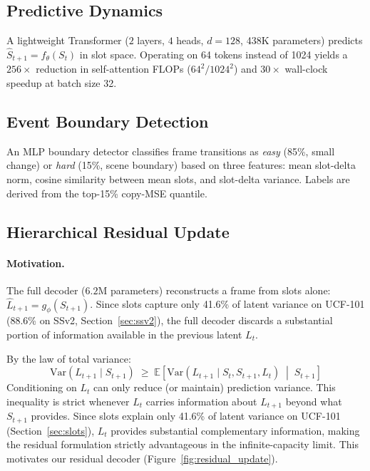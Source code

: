 \documentclass{article}
\begin{document}
\subsection{Predictive Dynamics}
\label{sec:dynamics}

A lightweight Transformer ($2$ layers, $4$ heads, $d{=}128$, 438K
parameters) predicts $\hat{S}_{t+1} = f_\theta(S_t)$ in slot space.
Operating on 64 tokens instead of 1024 yields a $256\times$ reduction
in self-attention FLOPs ($64^2/1024^2$) and $30\times$ wall-clock
speedup at batch size 32.

\subsection{Event Boundary Detection}
\label{sec:boundary}

An MLP boundary detector classifies frame transitions as \emph{easy}
(85\%, small change) or \emph{hard} (15\%, scene boundary) based on
three features: mean slot-delta norm, cosine similarity between mean
slots, and slot-delta variance.
Labels are derived from the top-15\% copy-MSE quantile.

\subsection{Hierarchical Residual Update}
\label{sec:residual}

\paragraph{Motivation.}
The full decoder ($6.2$M parameters) reconstructs a frame from slots
alone: $\hat{L}_{t+1} = g_\phi(S_{t+1})$.
Since slots capture only 41.6\% of latent variance on UCF-101 (88.6\%
on SSv2, Section~\ref{sec:ssv2}), the full decoder discards a
substantial portion of information available in the previous latent
$L_t$.

By the law of total variance:
\begin{equation}
\text{Var}(L_{t+1} \mid S_{t+1})
  \;\geq\; \mathbb{E}\!\left[
    \text{Var}(L_{t+1} \mid S_t, S_{t+1}, L_t)
    \;\middle|\; S_{t+1}
  \right]
\label{eq:total_variance}
\end{equation}
Conditioning on $L_t$ can only reduce (or maintain) prediction
variance.
This inequality is strict whenever $L_t$ carries information about
$L_{t+1}$ beyond what $S_{t+1}$ provides.
Since slots explain only 41.6\% of latent variance on UCF-101
(Section~\ref{sec:slots}), $L_t$ provides substantial complementary
information, making the residual formulation strictly advantageous
in the infinite-capacity limit.
This motivates our residual decoder (Figure~\ref{fig:residual_update}).
\end{document}
